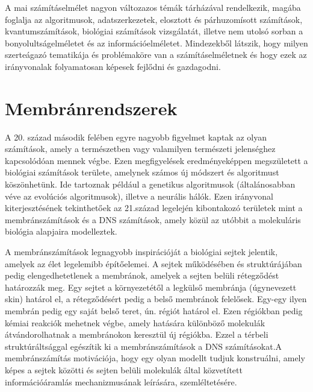

A mai számításelmélet nagyon változazos témák tárházával rendelkezik, 
magába foglalja az algoritmusok, adatszerkezetek, elosztott és párhuzomísott számítások, kvantumszámítások, biológiai számítások vizsgálatát, illetve nem utolsó sorban a bonyolultságelméletet és az információelméletet.
Mindezekből látszik, hogy milyen szerteágazó tematikája és problémaköre van a számításelméletnek és hogy ezek az irányvonalak folyamatosan képesek fejlődni és gazdagodni.

\section{Membránrendszerek}

A 20. század második felében egyre nagyobb figyelmet kaptak az olyan számítások, amely a természetben vagy valamilyen természeti jelenséghez kapcsolódóan mennek végbe. Ezen megfigyelések eredményeképpen megszületett a biológiai számítások területe, amelynek számos új módszert és algoritmust köszönhetünk. Ide tartoznak például a genetikus algoritmusok (általánosabban véve az evolúciós algoritmusok), illetve a neurális hálók. Ezen irányvonal kiterjesztésének tekinthetőek az 21.század legelején kibontakozó területek mint a membránszámítások és a DNS számítások, amely közül az utóbbit a molekuláris biológia alapjaira modelleztek.

A membránszámítások legnagyobb inspirációját a biológiai sejtek jelentik, amelyek az élet legelemibb építőelemei. A sejtek működésében és struktúrájában pedig elengedhetetlenek a membránok, amelyek a sejten belüli rétegződést határozzák meg. Egy sejtet a környezetétől a legkülső membránja (úgynevezett skin) határol el, a rétegződésért pedig a belső membránok felelősek.  Egy-egy ilyen membrán pedig egy saját belső teret, ún. régiót határol el.
Ezen régiókban pedig kémiai reakciók mehetnek végbe, amely hatására különböző molekulák átvándorolhatnak a membránokon keresztül új régiókba. Ezzel a térbeli struktúráltsággal egészítik ki a membránszámítások a DNS számításokat.A  membránszámítás motivációja, hogy egy olyan modellt tudjuk konstruálni, amely képes a sejtek közötti és sejten belüli molekulák által közvetített információáramlás mechanizmusának leírására, szemléltetésére.

